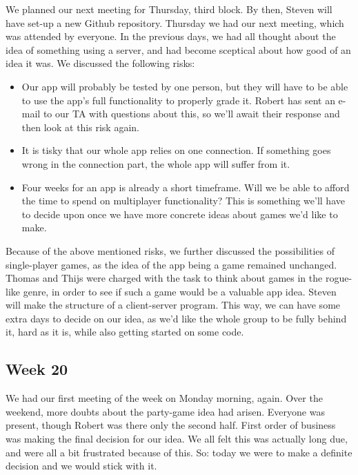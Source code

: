 \documentclass[../main.tex]{subfiles}
\begin{document}
We planned our next meeting for Thursday, third block. By then, Steven will have set-up a new Github repository.
\bigbreak\noindent
Thursday we had our next meeting, which was attended by everyone. In the previous days, we had all thought about the idea of something using a server, and had become sceptical about how good of an idea it was. We discussed the following risks:
\begin{itemize}
	\item Our app will probably be tested by one person, but they will have to be able to use the app's full functionality to properly grade it. Robert has sent an e-mail to our TA with questions about this, so we'll await their response and then look at this risk again.
		\item It is tisky that our whole app relies on one connection. If something goes wrong in the connection part, the whole app will suffer from it.
		\item Four weeks for an app is already a short timeframe. Will we be able to afford the time to spend on multiplayer functionality? This is something we'll have to decide upon once we have more concrete ideas about games we'd like to make.
\end{itemize}
Because of the above mentioned risks, we further discussed the possibilities of single-player games, as the idea of the app being a game remained unchanged. Thomas and Thijs were charged with the task to think about games in the rogue-like genre, in order to see if such a game would be a valuable app idea. Steven will make the structure of a client-server program. This way, we can have some extra days to decide on our idea, as we'd like the whole group to be fully behind it, hard as it is, while also getting started on some code.


\subsection*{Week 20}
We had our first meeting of the week on Monday morning, again. Over the weekend, more doubts about the party-game idea had arisen. Everyone was present, though Robert was there only the second half. First order of business was making the final decision for our idea. We all felt this was actually long due, and were all a bit frustrated because of this. So: today we were to make a definite decision and we would stick with it.
\end{document}
